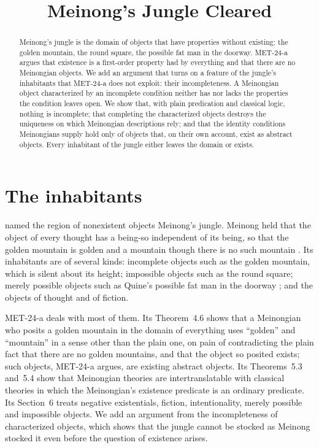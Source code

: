 \documentclass{situationist-preprint}
\title{Meinong's Jungle Cleared}
\begin{document}
\maketitle

\begin{abstract}
Meinong's jungle is the domain of objects that have properties without existing: the golden mountain, the round square, the possible fat man in the doorway. MET-24-a argues that existence is a first-order property had by everything and that there are no Meinongian objects. We add an argument that turns on a feature of the jungle's inhabitants that MET-24-a does not exploit: their incompleteness. A Meinongian object characterized by an incomplete condition neither has nor lacks the properties the condition leaves open. We show that, with plain predication and classical logic, nothing is incomplete; that completing the characterized objects destroys the uniqueness on which Meinongian descriptions rely; and that the identity conditions Meinongians supply hold only of objects that, on their own account, exist as abstract objects. Every inhabitant of the jungle either leaves the domain or exists.
\end{abstract}

\section{The inhabitants}

\citet{Routley1980} named the region of nonexistent objects Meinong's jungle. Meinong held that the object of every thought has a being-so independent of its being, so that the golden mountain is golden and a mountain though there is no such mountain \citep{Meinong1904}. Its inhabitants are of several kinds: incomplete objects such as the golden mountain, which is silent about its height; impossible objects such as the round square; merely possible objects such as Quine's possible fat man in the doorway \citep{Quine1948}; and the objects of thought and of fiction.

MET-24-a deals with most of them. Its Theorem~4.6 shows that a Meinongian who posits a golden mountain in the domain of everything uses \enquote{golden} and \enquote{mountain} in a sense other than the plain one, on pain of contradicting the plain fact that there are no golden mountains, and that the object so posited exists; such objects, MET-24-a argues, are existing abstract objects. Its Theorems~5.3 and~5.4 show that Meinongian theories are intertranslatable with classical theories in which the Meinongian's existence predicate is an ordinary predicate. Its Section~6 treats negative existentials, fiction, intentionality, merely possible and impossible objects. We add an argument from the incompleteness of characterized objects, which shows that the jungle cannot be stocked as Meinong stocked it even before the question of existence arises.
\end{document}
